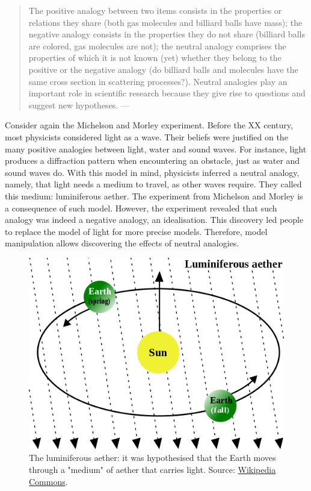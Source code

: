 \documentclass[
]{book}
\begin{document}
\begin{quote}
The positive analogy between two items consists in the properties or relations they share (both gas molecules and billiard balls have mass); the negative analogy consists in the properties they do not share (billiard balls are colored, gas molecules are not); the neutral analogy comprises the properties of which it is not known (yet) whether they belong to the positive or the negative analogy (do billiard balls and molecules have the same cross section in scattering processes?). Neutral analogies play an important role in scientific research because they give rise to questions and suggest new hypotheses. --- \citep{sep-models-science}
\end{quote}

Consider again the Michelson and Morley experiment. Before the XX century, most physicists considered light as a wave. Their beliefs were justified on the many positive analogies between light, water and sound waves. For instance, light produces a diffraction pattern when encountering an obstacle, just as water and sound waves do. With this model in mind, physicists inferred a neutral analogy, namely, that light needs a medium to travel, as other waves require. They called this medium: luminiferous aether. The experiment from Michelson and Morley is a consequence of such model. However, the experiment revealed that such analogy was indeed a negative analogy, an idealisation. This discovery led people to replace the model of light for more precise models. Therefore, model manipulation allows discovering the effects of neutral analogies.



\begin{figure}

{\centering \includegraphics[width=0.5\linewidth]{Figures/luminiferous_aether} 

}

\caption{The luminiferous aether: it was hypothesised that the Earth moves through a "medium" of aether that carries light. Source: \href{https://commons.wikimedia.org/wiki/File:AetherWind.svg}{Wikipedia Commons}.}\label{fig:aether}
\end{figure}
\end{document}

